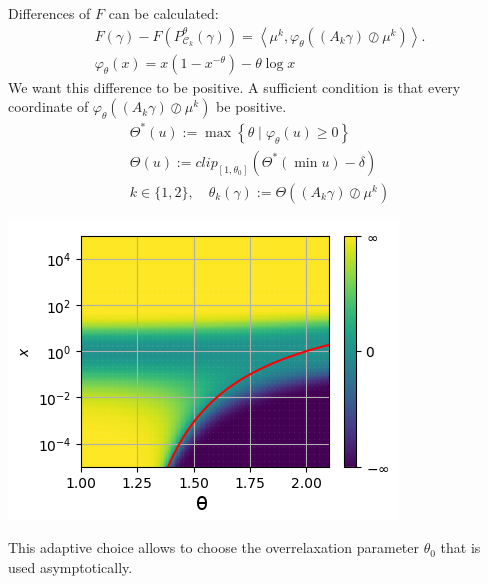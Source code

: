 \documentclass[landscape,a0paper,fontscale=0.35]{baposter} %
\theoremstyle{plain}
\theoremstyle{plain}
\theoremstyle{plain}
\theoremstyle{plain}
\newcommand{\scal}[2]{\left\langle #1 , #2 \right\rangle}
\DeclareMathOperator{\Ccal}{\mathcal{C}}
\begin{document}
\begin{poster}
{    \begin{minipage}{0.65\textwidth}
    	\vspace{0.6em}
    	Differences of $F$ can be calculated:
    	\begin{gather*} \label{eq:kl_diff_scal}
    	F(\gamma) - F(P^\theta_{\Ccal_k}(\gamma)) = 
    	\scal{\mu^k}{\varphi_\theta \left((A_k \gamma) \oslash \mu^k \right)}.\\
    	\varphi_\theta(x) = x(1-x^{-\theta}) - \theta \log x
    	\end{gather*}
    	We want this difference to be positive. A sufficient condition is that every coordinate of $\varphi_\theta \left((A_k \gamma) \oslash \mu^k \right)$ be positive.
    	\begin{gather*}
    	\Theta^*(u) := \max \left\{\theta \mid \varphi_\theta(u) \ge 0 \right\}
    	\\
    	\Theta(u) := clip_{[1,\theta_0]}(\Theta^*(\min u)-\delta)\\
    	k \in \{1,2\}, \quad \theta_k (\gamma) := \Theta((A_k \gamma) \oslash \mu^k)
    	\end{gather*}
    \end{minipage}
	\begin{minipage}{0.34\textwidth}
		\begin{tcolorbox}[size=small]
			\centering
			\includegraphics[width=\textwidth]{images/cvgce_zone_2.png}
		\end{tcolorbox}
	\end{minipage}
This adaptive choice allows to choose the overrelaxation parameter $\theta_0$ that is used asymptotically. 
}




\end{poster}
\end{document}
